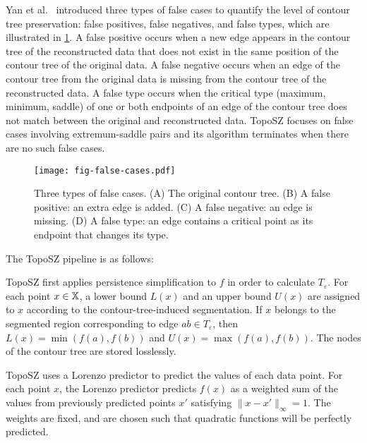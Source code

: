  Yan et al.~\cite{yan2023toposz} introduced three types of false cases to quantify the level of contour tree preservation: false positives, false negatives, and false types, which are illustrated in \cref{fig:false-cases}.
A false positive occurs when a new edge appears in the contour tree of the reconstructed data that does not exist in the same position of the contour tree of the original data. A false negative occurs when an edge of the contour tree from the original data is missing from the contour tree of the reconstructed data. 
A false type occurs when the critical type (maximum, minimum, saddle) of one or both endpoints of an edge of the contour tree does not match between the original and reconstructed data.
TopoSZ focuses on false cases involving extremum-saddle pairs and its algorithm terminates when there are no such false cases. 

\begin{figure}[!ht]
    \vspace{-2mm}
    \centering
    \texttt{[image: fig-false-cases.pdf]}
    \vspace{-6mm}
    \caption{Three types of false cases. (A) The original contour tree. (B) A false positive: an extra edge is added. (C) A false negative: an edge is missing. (D) A false type: an edge contains a critical point as its endpoint that changes its type.}
    \label{fig:false-cases}
    \vspace{-4mm}
\end{figure}


 The TopoSZ pipeline is as follows:

TopoSZ first applies persistence simplification to $f$ in order to calculate $T_\varepsilon$. For each point $x \in \mathbb{X}$, a lower bound $L(x)$ and an upper bound $U(x)$ are assigned to $x$ according to the contour-tree-induced segmentation.
If $x$ belongs to the segmented region corresponding to edge $ab \in T_\varepsilon$, then $L(x) = \min(f(a),f(b))$ and $U(x) = \max(f(a),f(b))$. The nodes of the contour tree are stored losslessly.

TopoSZ uses a Lorenzo predictor \cite{ibarria2003out} to predict the values of each data point. For each point $x$, the Lorenzo predictor predicts $f(x)$ as a weighted sum of the values from previously predicted points $x'$ satisfying $\|x-x'\|_\infty = 1$. The weights are fixed, and are chosen such that quadratic functions will be perfectly predicted.

